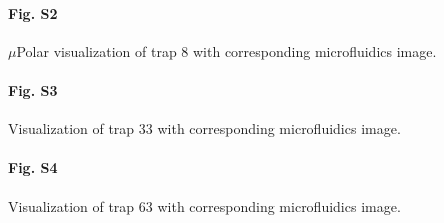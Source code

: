 \documentclass[conference]{IEEEtran}
\begin{document}
\paragraph*{Fig. S2}
\label{Fig_S2}
{$\mu$Polar visualization of trap 8
with corresponding microfluidics image}. 


\paragraph*{Fig. S3}
\label{Fig_S3}
{ Visualization of trap 33 with corresponding microfluidics image.
}



\paragraph*{Fig. S4}
\label{Fig_S4}
{Visualization of trap 63 with corresponding microfluidics image}. 





\end{document}

